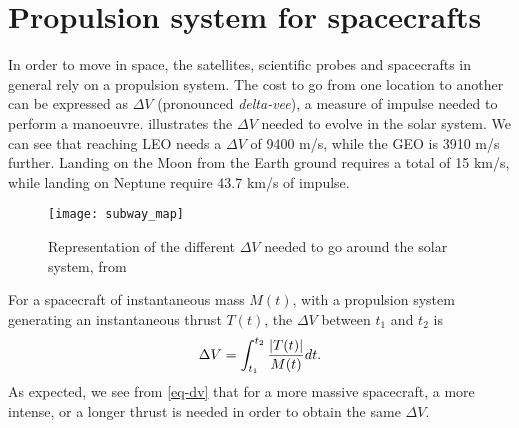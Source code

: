 


\section*{Propulsion system for spacecrafts}
\label{sec-propulsion}


In order to move in space, the satellites, scientific probes and spacecrafts in general rely on a propulsion system.
The cost to go from one location to another can be expressed as $\Delta V$ (pronounced \emph{delta-vee}), a measure of impulse needed to perform a manoeuvre.
 illustrates the $\Delta V$ needed to evolve in the solar system.
We can see that reaching \ac{LEO} needs a $\Delta V$ of 9400 m/s, while the \ac{GEO} is 3910 m/s further.
Landing on the Moon from the Earth ground requires a total of 15 km/s, while landing on Neptune require 43.7 km/s of impulse.
\begin{figure}[hbtp]
  \centering
  \texttt{[image: subway\_map]}
  \caption{Representation of the different $\Delta V$ needed to go around the solar system, from \citet{reddit-subway}}
  \label{fig-subway_DV}
\end{figure}

For a spacecraft of instantaneous mass $M(t)$, with a propulsion system generating an instantaneous thrust $T(t)$, the $\Delta V$ between $t_1$ and $t_2$ is
\begin{equation} \label{eq-dv}
  \Delta V = \int_{t_1}^{t_2} \frac{ \lvert T(t)\rvert}{M(t)} dt.
\end{equation}
As expected, we see from \cref{eq-dv} that for a more massive spacecraft, a more intense, or a longer thrust is needed in order to obtain the same $\Delta V$.

